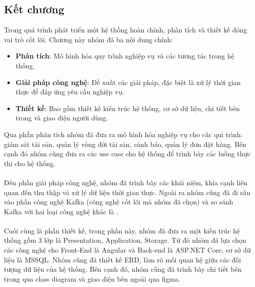 \subsection{Kết chương}
\noindent Trong quá trình phát triển một hệ thống hoàn chỉnh, phân tích và thiết kế đóng vai trò cốt lõi.
Chương này nhóm đã ba nội dung chính:
\begin{itemize}
    \item \textbf{Phân tích}: Mô hình hóa quy trình nghiệp vụ và các tương tác trong hệ thống.
    \item \textbf{Giải pháp công nghệ}: Đề xuất các giải pháp, đặc biệt là xử lý thời gian thực để đáp ứng yêu cầu nghiệp vụ.
    \item \textbf{Thiết kế}: Bao gồm thiết kế kiến trúc hệ thống, cơ sở dữ liệu, chi tiết bên trong và giao diện người dùng.
\end{itemize}
Qua phần phân tích nhóm đã đưa ra mô hình hóa nghiệp vụ cho các qui trình: giám sát tài sản, quản lý vòng đời tài sản, cảnh báo, quản lý đơn đặt hàng. Bên cạnh đó nhóm cũng đưa ra các use case cho hệ thống để trình bày các luồng thực thi cho hệ thống.\\ \\ 
Đến phần giải pháp công nghệ, nhóm đã trình bày các khái niệm, khía cạnh liên quan đến thu thập và xử lý dữ liệu thời gian thực. Ngoài ra nhóm cũng đã đi sâu vào phần công nghệ Kafka (công nghệ cốt lõi mà nhóm đã chọn) và so sánh Kafka với hai loại công nghệ khác là .\\ \\
Cuối cùng là phần thiết kế, trong phần này, nhóm đã đưa ra một kiến trúc hệ thống gồm 3 lớp là Presentation, Application, Storage. Từ đó nhóm đã lựa chọn các công nghệ cho Front-End là Angular và Back-end là ASP.NET Core, cơ sở dữ liệu là MSSQL. Nhóm cũng đã thiết kế ERD, làm rõ mối quan hệ giữa các đối tượng dữ liệu của hệ thống. Bên cạnh đó, nhóm cũng đã trình bày chi tiết bên trong qua class diagram và giao diện bên ngoài qua figma.



